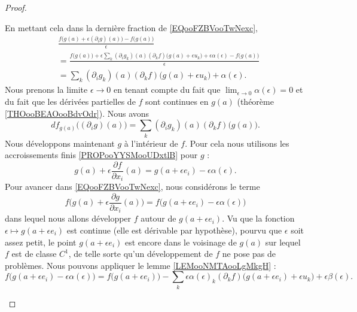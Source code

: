 \begin{proof}
\begin{subproof}
		En mettant cela dans la dernière fraction de \eqref{EQooFZBVooTwNexc},
		\begin{subequations}
			\begin{align}
				 & \frac{ f\big( g(a)+\epsilon(\partial_ig)(a) \big)-f\big( g(a) \big) }{ \epsilon }                                                                               \\
				 & =\frac{ f\big( g(a) \big)  +\epsilon\sum_k(\partial_ig_k)(a)(\partial_kf)\big(g(a)+\epsilon u_k\big)+\epsilon\alpha(\epsilon)-f\big( g(a) \big)   }{ \epsilon } \\
				 & =\sum_k(\partial_ig_k)(a)(\partial_kf)\big( g(a)+\epsilon u_k\big)+\alpha(\epsilon).
			\end{align}
		\end{subequations}
		Nous prenons la limite \( \epsilon\to 0\) en tenant compte du fait que \( \lim_{\epsilon\to 0}\alpha(\epsilon)=0\) et du fait que les dérivées partielles de \( f\) sont continues en \( g(a)\) (théorème \ref{THOooBEAOooBdvOdr}). Nous avons
		\begin{equation}
			df_{g(a)}\big( (\partial_ig)(a) \big)=\sum_k(\partial_ig_k)(a)(\partial_kf)\big( g(a) \big).
		\end{equation}
		\spitem[Développer \( g\)]
		Nous développons maintenant \( g\) à l'intérieur de \( f\). Pour cela nous utilisons les accroissements finis \ref{PROPooYYSMooUDxtlB} pour \( g\) :
		\begin{equation}
			g(a)+\epsilon\frac{ \partial f }{ \partial x_i }(a)=g(a+\epsilon e_i)-\epsilon\alpha(\epsilon).
		\end{equation}
		Pour avancer dans \eqref{EQooFZBVooTwNexc}, nous considérons le terme
		\begin{equation}
			f\big( g(a)+\epsilon\frac{ \partial g }{ \partial x_i }(a) \big)=
			f\big( g(a+\epsilon e_i)-\epsilon \alpha(\epsilon) \big)
		\end{equation}
		dans lequel nous allons développer \( f\) autour de \( g(a+\epsilon e_i)\). Vu que la fonction \( \epsilon\mapsto g(a+\epsilon e_i)\) est continue (elle est dérivable par hypothèse), pourvu que \( \epsilon\) soit assez petit, le point \( g(a+\epsilon e_i)\) est encore dans le voisinage de \( g(a)\) sur lequel \( f\) est de classe \( C^1\), de telle sorte qu'un développement de \( f\) ne pose pas de problèmes. Nous pouvons appliquer le lemme \eqref{LEMooNMTAooLgMkgH} :
		\begin{equation}
			f\big( g(a+\epsilon e_i)-\epsilon\alpha(\epsilon) \big)=f\big( g(a+\epsilon e_i) \big)-\sum_k\epsilon\alpha(\epsilon)_k(\partial_kf)\big( g(a+\epsilon e_i)+\epsilon u_k \big)+\epsilon\beta(\epsilon).

\end{equation}
\end{subproof}
\end{proof}
